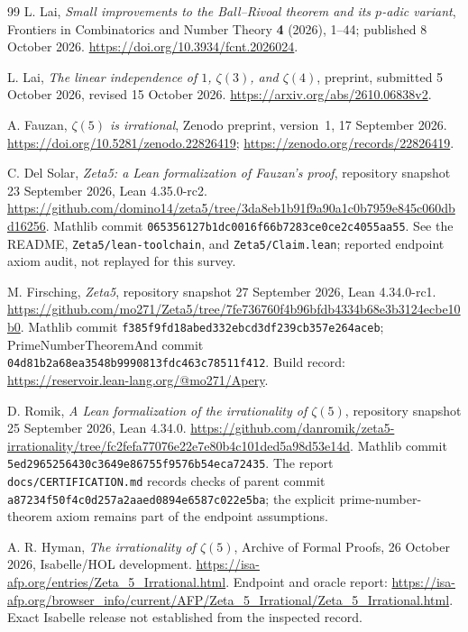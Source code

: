 \documentclass[11pt,letterpaper]{article}
\theoremstyle{definition}
\begin{document}
\begin{thebibliography}{99}
L. Lai, \emph{Small improvements to the Ball--Rivoal theorem and its
$p$-adic variant}, Frontiers in Combinatorics and Number Theory
\textbf{4} (2026), 1--44; published 8 October 2026.
\url{https://doi.org/10.3934/fcnt.2026024}.

L. Lai, \emph{The linear independence of $1$, $\zeta(3)$, and
$\zeta(4)$}, preprint, submitted 5 October 2026, revised 15 October
2026. \url{https://arxiv.org/abs/2610.06838v2}.

A. Fauzan, \emph{$\zeta(5)$ is irrational}, Zenodo preprint, version~1,
17 September 2026. \url{https://doi.org/10.5281/zenodo.22826419};
\url{https://zenodo.org/records/22826419}.

C. Del Solar, \emph{Zeta5: a Lean formalization of Fauzan's proof},
repository snapshot 23 September 2026, Lean 4.35.0-rc2.
\url{https://github.com/domino14/zeta5/tree/3da8eb1b91f9a90a1c0b7959e845c060dbd16256}.
Mathlib commit \texttt{065356127b1dc0016f66b7283ce0ce2c4055aa55}.
See the README, \texttt{Zeta5/lean-toolchain}, and
\texttt{Zeta5/Claim.lean}; reported endpoint axiom audit, not replayed
for this survey.

M. Firsching, \emph{Zeta5}, repository snapshot 27 September 2026,
Lean 4.34.0-rc1.
\url{https://github.com/mo271/Zeta5/tree/7fe736760f4b96bfdb4334b68e3b3124ecbe10b0}.
Mathlib commit \texttt{f385f9fd18abed332ebcd3df239cb357e264aceb};
PrimeNumberTheoremAnd commit
\texttt{04d81b2a68ea3548b9990813fdc463c78511f412}.
Build record: \url{https://reservoir.lean-lang.org/@mo271/Apery}.

D. Romik, \emph{A Lean formalization of the irrationality of
$\zeta(5)$}, repository snapshot 25 September 2026, Lean 4.34.0.
\url{https://github.com/danromik/zeta5-irrationality/tree/fc2fefa77076e22e7e80b4c101ded5a98d53e14d}.
Mathlib commit \texttt{5ed2965256430c3649e86755f9576b54eca72435}.
The report \texttt{docs/CERTIFICATION.md} records checks of parent
commit \texttt{a87234f50f4c0d257a2aaed0894e6587c022e5ba}; the explicit
prime-number-theorem axiom remains part of the endpoint assumptions.

A. R. Hyman, \emph{The irrationality of $\zeta(5)$}, Archive of
Formal Proofs, 26 October 2026, Isabelle/HOL development.
\url{https://isa-afp.org/entries/Zeta_5_Irrational.html}.
Endpoint and oracle report:
\url{https://isa-afp.org/browser_info/current/AFP/Zeta_5_Irrational/Zeta_5_Irrational.html}.
Exact Isabelle release not established from the inspected record.


\end{thebibliography}
\end{document}
